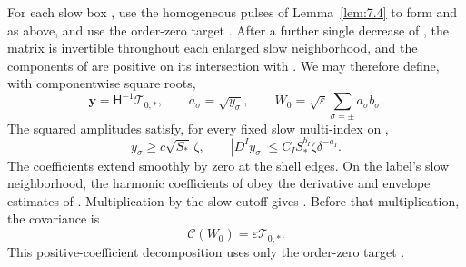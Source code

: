 \begin{proposition}\label{prop:7.5}
For each slow box , use the homogeneous pulses of
Lemma~\ref{lem:7.4} to form  and
 as above, and use the order-zero target
. After a further single decrease
of , the matrix  is invertible
throughout each enlarged slow neighborhood, and the components of
 are positive on its intersection with
. We may therefore define, with componentwise
square roots,
\begin{equation}
  \boldsymbol y=\mathsf H^{-1}\mathcal T_{0,*},
  \qquad a_\sigma=\sqrt{y_\sigma},
  \qquad W_0=\sqrt{\varepsilon}\sum_{\sigma=\pm}a_\sigma b_\sigma.
  \tag{7.24}\label{eq:7.24}
\end{equation}
The squared amplitudes satisfy, for every fixed slow multi-index
 on ,
\begin{equation}
  y_\sigma\geq c\sqrt{S_*}\,\zeta,
  \qquad
  |D^Iy_\sigma|\leq C_IS_*^{b_I}\zeta\delta^{-a_I}.
  \tag{7.25}\label{eq:7.25}
\end{equation}
The coefficients  extend smoothly by zero at the
shell edges. On the label's slow neighborhood, the harmonic coefficients of
 obey the derivative and envelope estimates of
. Multiplication by the slow cutoff gives
. Before that multiplication,
the covariance is
\begin{equation}
  \mathcal C(W_0)=\varepsilon\mathcal T_{0,*}.
  \tag{7.26}\label{eq:7.26}
\end{equation}
This positive-coefficient decomposition uses only the order-zero target
.
\end{proposition}

